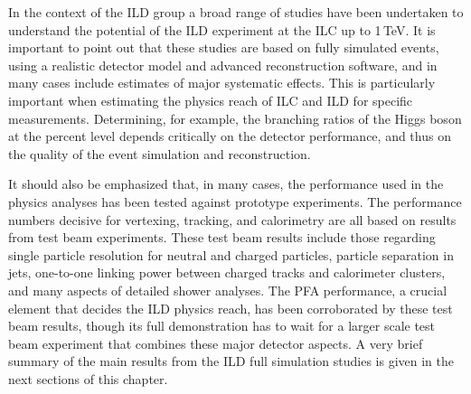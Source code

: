 
In the context of the ILD group a broad range of studies have been undertaken to understand the potential of the ILD experiment at the ILC up to 1\,TeV. 
It is important to point out that these studies are based on fully simulated events, using a realistic detector model and advanced reconstruction software, and in many cases include estimates of major systematic effects. This is particularly important when estimating the physics reach of ILC and ILD for specific measurements. Determining, for example, the branching ratios of the Higgs boson at the percent level depends critically on the detector performance, and thus on the quality of the event simulation and reconstruction.

It should also be emphasized that, in many cases, the performance used in the physics analyses has been tested against prototype experiments. The performance numbers decisive for vertexing, tracking, and calorimetry are all based on results from test beam experiments. These test beam results include those regarding single particle resolution for neutral and charged particles, particle separation in jets, one-to-one linking power between charged tracks and calorimeter clusters, and many aspects of detailed shower analyses. The PFA performance, a crucial element that decides the ILD physics reach, has been corroborated by these test beam results, though its full demonstration has to wait for a larger scale test beam experiment that combines these major detector aspects. 
A very brief summary of the main results from the ILD full simulation studies is given in the next sections of this chapter.

